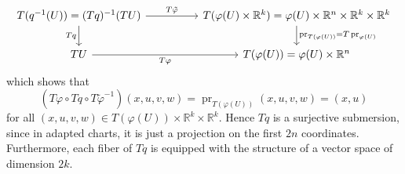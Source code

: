 \documentclass{amsart}
\theoremstyle{plain}
\newcommand{\R}{\mathbb{R}}
\newcommand{\inv}{^{-1}}
\DeclareMathOperator{\pr}{pr}
\begin{document}
\[\begin{tikzcd}
	{T(q^{-1}(U))=(Tq)^{-1}(TU)} && {T(\varphi(U)\times\mathbb R^k)=\varphi(U)\times\mathbb R^n\times\mathbb R^k\times\mathbb R^k} \\
	TU && {T(\varphi(U))=\varphi(U)\times\mathbb R^n}
	\arrow["{T\tilde\varphi}", from=1-1, to=1-3]
	\arrow["Tq"', from=1-1, to=2-1]
	\arrow["{\pr_{T(\varphi(U))}=T\pr_{\varphi(U)}}", from=1-3, to=2-3]
	\arrow["{T\varphi}"', from=2-1, to=2-3]
\end{tikzcd}\]
which shows that 
\[ (T\varphi\circ Tq\circ T\tilde \varphi\inv)(x,u,v,w)=\pr_{T(\varphi(U))}(x,u,v,w)=(x,u)
\]
for all $(x,u,v,w)\in T(\varphi(U))\times \R^k\times \R^k$. Hence $Tq$ is a surjective submersion, since in adapted charts, it is just a projection on the first $2n$ coordinates.
Furthermore, each fiber of $Tq$ is equipped with the structure of a vector space of dimension $2k$. 
\end{document}
